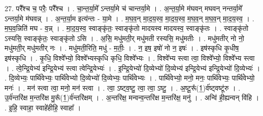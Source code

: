 \documentclass[17pt]{extarticle}
\begin{document}
27. परै᳚श्च च॒ परैः॒ परै᳚श्च । . चा॒न्त॒र्या॒मे᳚ ऽन्तर्या॒मे च॑ चान्तर्या॒मे । . अ॒न्त॒र्या॒मे म॑घवन् मघवन् नन्तर्या॒मे᳚ ऽन्तर्या॒मे म॑घवन्न् । . अ॒न्त॒र्या॒म इत्य॑न्तः - या॒मे । . म॒घ॒व॒न् मा॒द॒य॒स्व॒ मा॒द॒य॒स्व॒ म॒घ॒व॒न् म॒घ॒व॒न् मा॒द॒य॒स्व॒ । . म॒घ॒व॒न्निति॑ मघ - व॒न्न् । . मा॒द॒य॒स्व॒ स्वाङ्कृ॑तः॒ स्वाङ्कृ॑तो मादयस्व मादयस्व॒ स्वाङ्कृ॑तः । . स्वाङ्कृ॑तो ऽस्यसि॒ स्वाङ्कृ॑तः॒ स्वाङ्कृ॑तो ऽसि । . अ॒सि॒ मधु॑मती॒र् मधु॑मती रस्यसि॒ मधु॑मतीः । . मधु॑मतीर् नो नो॒ मधु॑मती॒र् मधु॑मतीर् नः । . मधु॑मती॒रिति॒ मधु॑ - म॒तीः॒ । . न॒ इष॒ इषो॑ नो न॒ इषः॑ । . इष॑स्कृधि कृ॒धीष॒ इष॑स्कृधि । . कृ॒धि॒ विश्वे᳚भ्यो॒ विश्वे᳚भ्यस्कृधि कृधि॒ विश्वे᳚भ्यः । . विश्वे᳚भ्य स्त्वा त्वा॒ विश्वे᳚भ्यो॒ विश्वे᳚भ्य स्त्वा । . त्वे॒न्द्रि॒येभ्य॑ इन्द्रि॒येभ्य॑ स्त्वा त्वेन्द्रि॒येभ्यः॑ । . इ॒न्द्रि॒येभ्यो॑ दि॒व्येभ्यो॑ दि॒व्येभ्य॑ इन्द्रि॒येभ्य॑ इन्द्रि॒येभ्यो॑ दि॒व्येभ्यः॑ । . दि॒व्येभ्यः॒ पार्थि॑वेभ्यः॒ पार्थि॑वेभ्यो दि॒व्येभ्यो॑ दि॒व्येभ्यः॒ पार्थि॑वेभ्यः । . पार्थि॑वेभ्यो॒ मनो॒ मनः॒ पार्थि॑वेभ्यः॒ पार्थि॑वेभ्यो॒ मनः॑ । . मन॑ स्त्वा त्वा॒ मनो॒ मन॑ स्त्वा । . त्वा॒ ऽष्ट्व॒ष्टु॒ त्वा॒ त्वा॒ ऽष्टु॒ । . अ॒ष्टू॒रू᳚(1॒)र्व॑ष्ट्वष्टू॑रु । . उ॒र्व॑न्तरि॑क्ष म॒न्तरि॑क्ष मु॒रू᳚(1॒)र्व॑न्तरि॑क्षम् । . अ॒न्तरि॑क्ष॒ मन्वन्व॒न्तरि॑क्ष म॒न्तरि॑क्ष॒ मनु॑ । . अन्वि॑ ही॒ह्यन्वन् वि॑हि । . इ॒हि॒ स्वाहा॒ स्वाहे॑हीहि॒ स्वाहा᳚ । \newline
\end{document}
